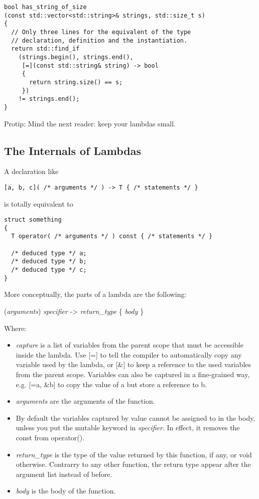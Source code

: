 \begin{lstlisting}
bool has_string_of_size
(const std::vector<std::string>& strings, std::size_t s)
{
  // Only three lines for the equivalent of the type
  // declaration, definition and the instantiation.
  return std::find_if
    (strings.begin(), strings.end(),
     [=](const std::string& string) -> bool
     {
       return string.size() == s;
     })
    != strings.end();
}
\end{lstlisting}

Protip: Mind the next reader: keep your lambdas small.

\subsection{The Internals of Lambdas}

A declaration like

\begin{lstlisting}
[a, b, c]( /* arguments */ ) -> T { /* statements */ }
\end{lstlisting}

is totally equivalent to

\begin{lstlisting}
struct something
{
  T operator( /* arguments */ ) const { /* statements */ }

  /* deduced type */ a;
  /* deduced type */ b;
  /* deduced type */ c;
}
\end{lstlisting}

More conceptually, the parts of a lambda are the following:

\bigskip

\indent [{\it capture}]({\it arguments}) {\it specifier} -\textgreater
        {\it return\_type} \{ {\it body} \}

\bigskip

Where:

\begin{itemize}
\item {\it capture} is a list of variables from the parent scope that
  must be accessible inside the lambda. Use [=] to tell the compiler
  to automatically copy any variable used by the lambda, or [\&] to
  keep a reference to the used variables from the parent
  scope. Variables can also be captured in a fine-grained way,
  e.g. [=a, \&b] to copy the value of a but store a reference to b.
\item {\it arguments} are the arguments of the function.
\item By default the variables captured by value cannot be assigned to
  in the body, unless you put the mutable keyword in {\it
    specifier}. In effect, it removes the const from operator().
\item {\it return\_type} is the type of the value returned by this
  function, if any, or void otherwise. Contrarry to any other
  function, the return type appear after the argument list instead of
  before.
\item {\it body} is the body of the function.
\end{itemize}

